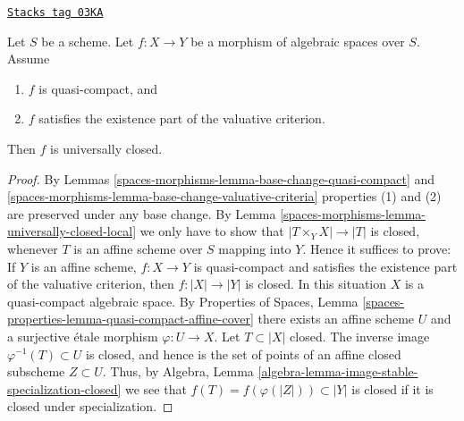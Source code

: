 \begin{lemma}
\label{spaces-morphisms-lemma-quasi-compact-existence-universally-closed}
\href{https://stacks.math.columbia.edu/tag/03KA}{\texttt{Stacks tag 03KA}}

Let $S$ be a scheme.
Let $f : X \to Y$ be a morphism of algebraic spaces over $S$.
Assume
\begin{enumerate}
\item $f$ is quasi-compact, and
\item $f$ satisfies the existence part of the valuative criterion.
\end{enumerate}
Then $f$ is universally closed.
\end{lemma}

\begin{proof}
By Lemmas \ref{spaces-morphisms-lemma-base-change-quasi-compact}
and \ref{spaces-morphisms-lemma-base-change-valuative-criteria}
properties (1) and (2) are preserved under
any base change. By Lemma \ref{spaces-morphisms-lemma-universally-closed-local}
we only have to show that $|T \times_Y X| \to |T|$ is closed,
whenever $T$ is an affine scheme over $S$ mapping into $Y$. Hence it
suffices to prove: If $Y$ is an affine scheme, $f : X \to Y$ is quasi-compact
and satisfies the existence part of the valuative criterion, then
$f : |X| \to |Y|$ is closed. In this situation $X$ is a quasi-compact
algebraic space. By
Properties of Spaces,
Lemma \ref{spaces-properties-lemma-quasi-compact-affine-cover}
there exists an affine scheme $U$ and a surjective \'etale morphism
$\varphi : U \to X$. Let $T \subset |X|$ closed. The inverse image
$\varphi^{-1}(T) \subset U$ is closed, and hence is the set of points
of an affine closed subscheme $Z \subset U$. Thus, by
Algebra, Lemma \ref{algebra-lemma-image-stable-specialization-closed}
we see that $f(T) = f(\varphi(|Z|)) \subset |Y|$ is closed if it is
closed under specialization.


\end{proof}
